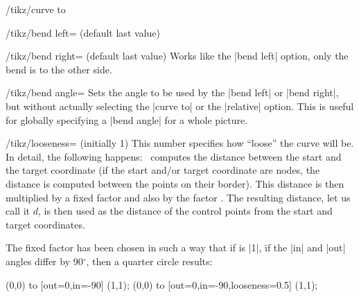 \begin{key}{/tikz/curve to}
\begin{key}{/tikz/bend left= (default \normalfont last value)}
\begin{codeexample}[preamble={\usetikzlibrary{automata,positioning}}]
\end{codeexample}

\begin{codeexample}[]
\end{codeexample}
    \end{key}

    \begin{key}{/tikz/bend right= (default \normalfont last  value)}
        Works like the |bend left| option, only the bend is to the other side.
    \end{key}

    \begin{key}{/tikz/bend angle=}
        Sets the angle to be used by the |bend left| or |bend right|, but
        without actually selecting the |curve to| or the |relative| option.
        This is useful for globally specifying a |bend angle| for a whole
        picture.
    \end{key}

    \begin{key}{/tikz/looseness= (initially 1)}
        This number specifies how ``loose'' the curve will be. In detail, the
        following happens: \tikzname\ computes the distance between the start
        and the target coordinate (if the start and/or target coordinate are
        nodes, the distance is computed between the points on their border).
        This distance is then multiplied by a fixed factor and also by the
        factor . The resulting distance, let us call it $d$, is
        then used as the distance of the control points from the start and
        target coordinates.

        The fixed factor has been chosen in such a way that if  is
        |1|, if the |in| and |out| angles differ by 90$^\circ$, then a quarter
        circle results:
\begin{codeexample}[]
\tikz \draw (0,0) to [out=0,in=-90]               (1,1);
\tikz \draw (0,0) to [out=0,in=-90,looseness=0.5] (1,1);
\end{codeexample}
    \end{key}


\end{key}
